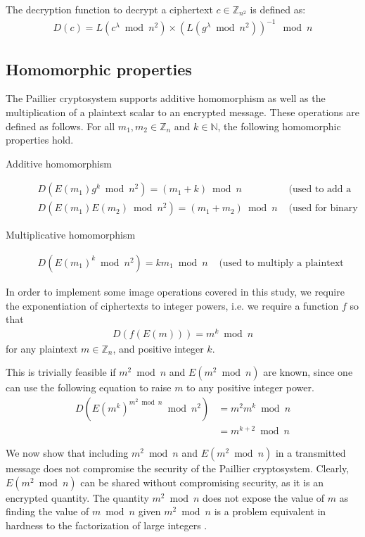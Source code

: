 The decryption function to decrypt a ciphertext $c \in \mathbb{Z}_{n^2}$ is defined as:
\begin{align*}
  D(c) = L(c^\lambda \bmod n^2) \times (L(g^\lambda \bmod n^2))^{-1} \mod n
\end{align*}

\subsection{Homomorphic properties}
The Paillier cryptosystem supports additive homomorphism as well as the multiplication of a plaintext scalar to an encrypted message. These operations are defined as follows.
For all $m_1,m_2 \in \mathbb{Z}_n$ and $k\in \mathbb{N}$, the following homomorphic properties hold.
\begin{description}
  \item[Additive homomorphism]
  \begin{align*}
    D(E(m_1)g^k\bmod n^2)=(m_1+k)\bmod n & \text{ (used to add a constant)}\\
    D(E(m_1)E(m_2)\bmod n^2)=(m_1+m_2)\bmod n & \text{ (used for binary addition)}
  \end{align*}
  \item[Multiplicative homomorphism]
  \begin{align*}
    D(E(m_1)^k\bmod n^2)= km_1\bmod n & \text{ (used to multiply a plaintext constant)}
  \end{align*}
\end{description}
In order to implement some image operations covered in this study, we require the exponentiation of ciphertexts to integer powers, i.e. we require a function $f$ so that
\begin{align*}
	D(f(E(m))) = m^k\bmod n
\end{align*}
for any plaintext $m \in \mathbb{Z}_n$, and positive integer $k$.

This is trivially feasible if $m^2 \bmod n$ and $E(m^2 \bmod n)$ are known, since one can use the following equation to raise $m$ to any positive integer power.
\begin{align*}
	D(E(m^k)^{m^2 \bmod n}\bmod n^2) &= m^2m^k\bmod n \\
	&= m^{k+2}\bmod n
\end{align*}

We now show that including $m^2 \bmod n$ and $E(m^2 \bmod n)$ in a transmitted message does not compromise the security of the Paillier cryptosystem. Clearly, $E(m^2 \bmod n)$ can be shared without compromising security, as it is an encrypted quantity. The quantity $m^2 \bmod n$ does not expose the value of $m$ as finding the value of $m \bmod n$ given $m^2 \bmod n$ is a problem equivalent in hardness to the factorization of large integers \cite{crandall_prime_2005}.

